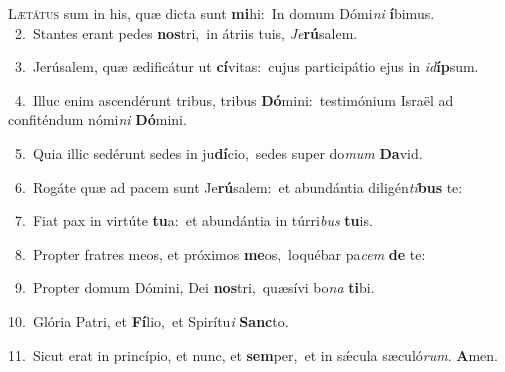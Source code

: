 \lettrine{\initial\textcolor{\initialcolor}{L}}{ætátus} sum in his, quæ dicta sunt \textbf{mi}\-hi:~\star In domum Dómi\textit{ni} \textbf{í}\-bimus.\\
{\numbfont\textcolor{\numbcolor}{~2.}}~Stantes erant pedes \textbf{nos}\-tri,~\star in átriis tuis, \textit{Je}\-\textbf{rú}salem.\par
{\numbfont\textcolor{\numbcolor}{~3.}}~Jerúsalem, quæ ædificátur ut \textbf{cí}\-vitas:~\star cujus participátio ejus in \textit{id}\-\textbf{íp}sum.\par
{\numbfont\textcolor{\numbcolor}{~4.}}~Illuc enim ascendérunt tribus, tribus \textbf{Dó}\-mini:~\star testimónium Israël ad confiténdum nómi\textit{ni} \textbf{Dó}\-mini.\par
{\numbfont\textcolor{\numbcolor}{~5.}}~Quia illic sedérunt sedes in ju\-\textbf{dí}\-cio,~\star sedes super do\textit{mum} \textbf{Da}\-vid.\par
{\numbfont\textcolor{\numbcolor}{~6.}}~Rogáte quæ ad pacem sunt Je\-\textbf{rú}\-salem:~\star et abundántia diligén\-\textit{ti}\-\textbf{bus} te:\par
{\numbfont\textcolor{\numbcolor}{~7.}}~Fiat pax in virtúte \textbf{tu}\-a:~\star et abundántia in túrri\textit{bus} \textbf{tu}\-is.\par
{\numbfont\textcolor{\numbcolor}{~8.}}~Propter fratres meos, et próximos \textbf{me}\-os,~\star loquébar pa\textit{cem} \textbf{de} te:\par
{\numbfont\textcolor{\numbcolor}{~9.}}~Propter domum Dómini, Dei \textbf{nos}\-tri,~\star quæsívi bo\textit{na} \textbf{ti}\-bi.\par
{\numbfont\textcolor{\numbcolor}{10.}}~Glória Patri, et \textbf{Fí}\-lio,~\star et Spirítu\textit{i} \textbf{Sanc}\-to.\par
{\numbfont\textcolor{\numbcolor}{11.}}~Sicut erat in princípio, et nunc, et \textbf{sem}\-per,~\star et in sǽcula sæculó\-\textit{rum}\-. \textbf{A}\-men.\par
